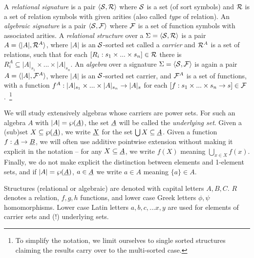 \documentclass[10pt]{article}
\begin{document}
A {\em relational signature\/}
 is a pair $\langle{\cal S},{\cal R} \rangle$ where ${\cal S}$ is a set (of sort symbols)
and ${\cal R}$ is a set of relation symbols with given arities (also called
{\em type} of relation).
An {\em algebraic signature\/} is a pair $\langle{\cal S},{\cal F} \rangle$ where 
${\cal F}$ is a set of function symbols with associated arities.
A {\em relational structure\/} over a $\Sigma=\langle{\cal S},{\cal R}\rangle$
is a pair $A= \langle|A|, {\cal R}^A\rangle$, where $|A|$ is
an ${\cal S}$-sorted set called a {\em carrier\/} and ${\cal R}^A$ is a set of
relations, such that for each $[R_i : s_1\times...\times s_n]\in {\cal R}$
there is $R_i^A \subseteq |A|_{s_1}\times...\times |A|_{s_n}$. 
An {\em algebra\/} over a signature $\Sigma=\langle{\cal S},{\cal F}\rangle$ 
is again a pair $A= \langle|A|, {\cal F}^A\rangle$, where $|A|$ is
an ${\cal S}$-sorted set carrier, and ${\cal F}^A$ is a set of
functions, with a function $f^A : |A|_{s_1}\times...\times |A|_{s_n} \rightarrow
|A|_s$ for each $[f : s_1\times...\times s_n\rightarrow s]\in 
{\cal F}$.~\footnote{To simplify the notation, we limit
ourselves to single sorted structures
claiming the results carry over to the multi-sorted case.}

We will study extensively algebras whose carriers are
power sets. 
For such an algebra $A$ with $|A|=\wp(\underline {A})$, the
set $\underline {A}$ will be called the {\em underlying set}. 
Given a (sub)set $X\subseteq\wp(\underline {A})$, 
we write $\underline {X}$ for the set $\bigcup X\subseteq\underline {A}$. 
Given a function $f:\underline {A}\rightarrow \underline {B}$, we will often use additive pointwise extension
without making it explicit in the notation -- for any $X\subseteq \underline {A}$, we write
$f(X)$ meaning $\bigcup_{x\in X} f(x)$.
Finally, we do not make explicit the distinction
between elements and 1-element sets, and if $|A|=\wp(\underline {A})$, $a\in\underline {A}$ we write $a\in A$ meaning $\{a\}\in A$.

Structures (relational or algebraic) are denoted with capital letters $A,B,C$.
$R$ denotes a relation, $f,g,h$ functions, and lower case Greek letters
$\phi,\psi$ homomorphisms.
 Lower case Latin letters $a,b,c,... 
x,y$ are used for elements of carrier sets and (!) underlying sets. 
\end{document}
